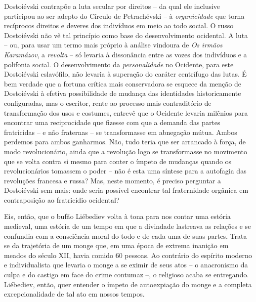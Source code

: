 Dostoiévski contrapõe a luta secular por direitos -- da qual ele
inclusive participou ao ser adepto do Círculo de Petrachévski -- à
\emph{organicidade} que torna recíprocos direitos e deveres dos
indivíduos em meio ao todo social. O russo Dostoiévski não vê tal
princípio como base do desenvolvimento ocidental. A luta -- ou, para
usar um termo mais próprio à análise vindoura de \emph{Os irmãos
Karamázov}, a \emph{revolta} -- só levaria à dissonância entre as vozes
dos indivíduos e a polifonia social. O desenvolvimento da
\emph{personalidade} no Ocidente, para este Dostoiévski eslavófilo, não
levaria à superação do caráter centrífugo das lutas. É bem verdade que a
fortuna crítica mais conservadora se esquece da menção de Dostoiévski à
efetiva possibilidade de mudança das identidades historicamente
configuradas, mas o escritor, rente ao processo mais contraditório de
transformação dos usos e costumes, entrevê que o Ocidente levaria
milênios para encontrar uma reciprocidade que fizesse com que a demanda
das partes fratricidas -- e não fraternas -- se transformasse em
abnegação mútua. Ambos perdemos para ambos ganharmos. Não, tudo teria
que ser arrancado à força, de modo revolucionário, ainda que a revolução
logo se transformasse no movimento que se volta contra si mesmo para
conter o ímpeto de mudanças quando os revolucionários tomassem o poder
-- não é esta uma síntese para a autofagia das revoluções francesa e
russa? Mas, neste momento, é preciso perguntar a Dostoiévski sem mais:
onde seria possível encontrar tal fraternidade orgânica em contraposição
ao fratricídio ocidental?

Eis, então, que o bufão Liébediev volta à tona para nos contar uma
estória medieval, uma estória de um tempo em que a divindade lastreava
as relações e se confundia com a consciência moral do todo e de cada uma
de suas partes. Trata-se da trajetória de um monge que, em uma época de
extrema inanição em meados do século XII, havia comido 60 pessoas. Ao
contrário do espírito moderno e individualista que levaria o monge a se
eximir de seus atos -- o anacronismo da culpa e do castigo em face do
crime contumaz --, o religioso acaba se entregando. Liébediev, então,
quer entender o ímpeto de autoexpiação do monge e a completa
excepcionalidade de tal ato em nossos tempos.

